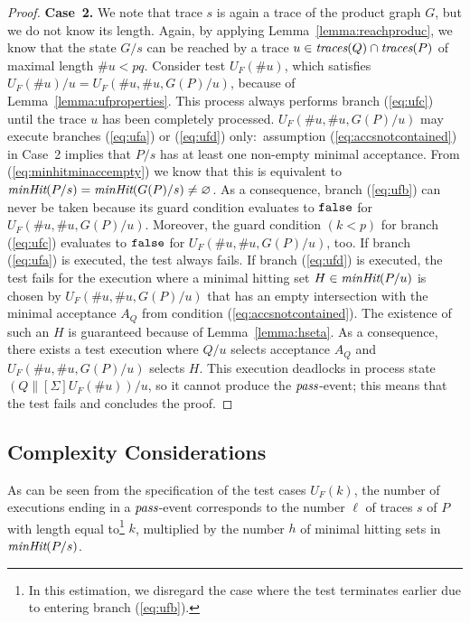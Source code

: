 \begin{proof}
\medskip
\noindent
{\bf Case~2.} We note that trace $s$ is again a trace of the product graph
$G$, but we do not know its length. Again, by applying Lemma~\ref{lemma:reachproduc},
we know that the state   $G/s$ can   be reached by a trace
$u\in\text{\it traces}(Q)\cap\text{\it traces}(P)$ of maximal length $\#u < pq$. Consider test $U_F(\#
u)$, which satisfies $U_F(\# u)/u = U_F(\#u,\#u,G(P)/u)$, because of Lemma~\ref{lemma:ufproperties}. This process   always performs
branch (\ref{eq:ufc}) until the trace $u$ has been completely processed.
$U_F(\#u,\#u,G(P)/u)$ may execute branches (\ref{eq:ufa}) or (\ref{eq:ufd})
only:~assumption (\ref{eq:accsnotcontained}) in Case~2 implies that $P/s$ has
at least one non-empty minimal acceptance. From (\ref{eq:minhitminaccempty}) 
we know that this is equivalent to $\text{\it minHit}(P/s) = \text{\it minHit}(G(P)/s)\neq\varnothing$.
As a consequence, branch (\ref{eq:ufb}) can never be taken because its guard condition
evaluates to $\mbox{{\tt false}}$  for $U_F(\#u,\#u,G(P)/u)$.
Moreover, the guard condition $(k < p)$ for branch (\ref{eq:ufc}) evaluates
to $\mbox{{\tt false}}$ for $U_F(\#u,\#u,G(P)/u)$, too. If branch (\ref{eq:ufa}) is executed, the
test always fails. If branch (\ref{eq:ufd}) is executed, the test fails for
the execution where a minimal hitting set $H\in\text{\it minHit}(P/u)$ is chosen
by $U_F(\#u,\#u,G(P)/u)$ that has an empty intersection with the minimal acceptance
$A_Q$ from condition (\ref{eq:accsnotcontained}). The existence of such an
$H$ is guaranteed because of Lemma~\ref{lemma:hseta}. As a consequence, there
exists a test execution   where $Q/u$ selects acceptance $A_Q$ and
$U_F(\#u,\#u,G(P)/u)$ selects $H$. This execution deadlocks in process state
$(Q\parallel[\Sigma]U_F(\# u))/u$, so it cannot produce the ${\text{\it pass}}$-event;
this  means that the test fails and concludes the proof. 
\xbox
\end{proof}

\subsection{Complexity Considerations}
\label{sec:complexity}

As can be seen from the specification of the test cases $U_F(k)$, the number of
executions ending in a ${\text{\it pass}}$-event corresponds to the number $\ell$ of traces $s$
of $P$ with length equal to\footnote{In this estimation, we disregard
the case where the test
terminates earlier due to entering branch (\ref{eq:ufb}).} $k$,
multiplied by the number $h$ of minimal hitting sets in
$\text{\it minHit}(P/s)$. 



